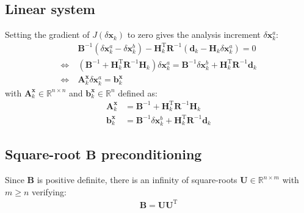 \documentclass[12pt]{scrartcl}
\begin{document}
\subsection{Linear system}
Setting the gradient of $J(\delta \mathbf{x}_k)$ to zero gives the analysis increment $\delta \mathbf{x}^a_k$:
\begin{align}
\label{eq:inc}
& \ \mathbf{B}^{-1} \left(\delta \mathbf{x}^a_k - \delta \mathbf{x}^b_k\right) - \mathbf{H}_k^\mathrm{T} \mathbf{R}^{-1} \left(\mathbf{d}_k - \mathbf{H}_k \delta \mathbf{x}^a_k\right) = 0 \nonumber \\
\Leftrightarrow & \ \left(\mathbf{B}^{-1} + \mathbf{H}_k^\mathrm{T} \mathbf{R}^{-1} \mathbf{H}_k\right) \delta \mathbf{x}^a_k = \mathbf{B}^{-1} \delta \mathbf{x}^b_k + \mathbf{H}_k^\mathrm{T} \mathbf{R}^{-1} \mathbf{d}_k \nonumber \\
\Leftrightarrow & \ \boxed{\mathbf{A}^\mathbf{x}_k \delta \mathbf{x}^a_k = \mathbf{b}^\mathbf{x}_k}
\end{align}
with $\mathbf{A}^\mathbf{x}_k \in \mathbb{R}^{n \times n}$ and $\mathbf{b}^\mathbf{x}_k \in \mathbb{R}^{n}$ defined as:
\begin{align}
\mathbf{A}^\mathbf{x}_k & = \mathbf{B}^{-1} + \mathbf{H}_k^\mathrm{T} \mathbf{R}^{-1} \mathbf{H}_k \\
\mathbf{b}^\mathbf{x}_k & = \mathbf{B}^{-1} \delta \mathbf{x}^b_k + \mathbf{H}_k^\mathrm{T} \mathbf{R}^{-1} \mathbf{d}_k
\end{align}

\subsection{Square-root $\mathbf{B}$ preconditioning}
Since $\mathbf{B}$ is positive definite, there is an infinity of square-roots $\mathbf{U} \in \mathbb{R}^{n \times m}$ with $m \ge n$ verifying:
\begin{align}
\mathbf{B} = \mathbf{U} \mathbf{U}^\mathrm{T}
\end{align}
\end{document}
